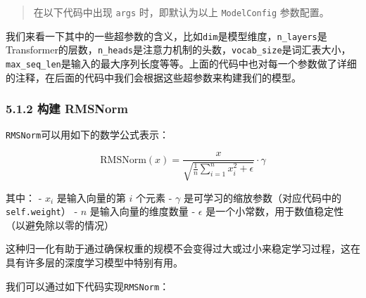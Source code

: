 \documentclass[
]{article}
\begin{document}
\begin{quote}
在以下代码中出现 \texttt{args} 时，即默认为以上 \texttt{ModelConfig}
参数配置。
\end{quote}

我们来看一下其中的一些超参数的含义，比如\texttt{dim}是模型维度，\texttt{n\_layers}是Transformer的层数，\texttt{n\_heads}是注意力机制的头数，\texttt{vocab\_size}是词汇表大小，\texttt{max\_seq\_len}是输入的最大序列长度等等。上面的代码中也对每一个参数做了详细的注释，在后面的代码中我们会根据这些超参数来构建我们的模型。

\subsubsection{5.1.2 构建 RMSNorm}\label{ux6784ux5efa-rmsnorm}

\texttt{RMSNorm}可以用如下的数学公式表示：

\[
\text{RMSNorm}(x) = \frac{x}{\sqrt{\frac{1}{n}\sum_{i=1}^{n}x_i^2 + \epsilon}} \cdot \gamma
\]

其中： - \(x_i\) 是输入向量的第 \(i\) 个元素 - \(\gamma\)
是可学习的缩放参数（对应代码中的 \texttt{self.weight}） - \(n\)
是输入向量的维度数量 - \(\epsilon\)
是一个小常数，用于数值稳定性（以避免除以零的情况）

这种归一化有助于通过确保权重的规模不会变得过大或过小来稳定学习过程，这在具有许多层的深度学习模型中特别有用。

我们可以通过如下代码实现\texttt{RMSNorm}：
\end{document}
